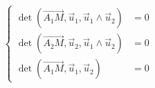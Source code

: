 \begin{equation*}
 \left\lbrace 
\begin{aligned}
 \det(\overrightarrow{A_1M},\overrightarrow u _1, \overrightarrow u _1 \wedge \overrightarrow u _2) &=0\\
 \det(\overrightarrow{A_2M},\overrightarrow u _2, \overrightarrow u _1 \wedge \overrightarrow u _2) &=0 \\
 \det(\overrightarrow{A_1M},\overrightarrow u _1, \overrightarrow u _2 ) &=0
\end{aligned}
\right. 
\end{equation*}
